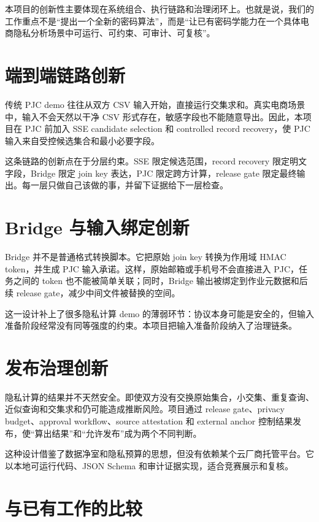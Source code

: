 \documentclass[UTF8,a4paper,12pt,oneside]{ctexrep}
\begin{document}
本项目的创新性主要体现在系统组合、执行链路和治理闭环上。也就是说，我们的工作重点不是“提出一个全新的密码算法”，而是“让已有密码学能力在一个具体电商隐私分析场景中可运行、可约束、可审计、可复核”。

\section{端到端链路创新}

传统 PJC demo 往往从双方 CSV 输入开始，直接运行交集求和。真实电商场景中，输入不会天然以干净 CSV 形式存在，敏感字段也不能随意导出。因此，本项目在 PJC 前加入 SSE candidate selection 和 controlled record recovery，使 PJC 输入来自受控候选集合和最小必要字段。

这条链路的创新点在于分层约束。SSE 限定候选范围，record recovery 限定明文字段，Bridge 限定 join key 表达，PJC 限定跨方计算，release gate 限定最终输出。每一层只做自己该做的事，并留下证据给下一层检查。

\section{Bridge 与输入绑定创新}

Bridge 并不是普通格式转换脚本。它把原始 join key 转换为作用域 HMAC token，并生成 PJC 输入承诺。这样，原始邮箱或手机号不会直接进入 PJC，任务之间的 token 也不能被简单关联；同时，Bridge 输出被绑定到作业元数据和后续 release gate，减少中间文件被替换的空间。

这一设计补上了很多隐私计算 demo 的薄弱环节：协议本身可能是安全的，但输入准备阶段经常没有同等强度的约束。本项目把输入准备阶段纳入了治理链条。

\section{发布治理创新}

隐私计算的结果并不天然安全。即使双方没有交换原始集合，小交集、重复查询、近似查询和交集求和仍可能造成推断风险。项目通过 release gate、privacy budget、approval workflow、source attestation 和 external anchor 控制结果发布，使“算出结果”和“允许发布”成为两个不同判断。

这种设计借鉴了数据净室和隐私预算的思想，但没有依赖某个云厂商托管平台。它以本地可运行代码、JSON Schema 和审计证据实现，适合竞赛展示和复核。

\section{与已有工作的比较}
\end{document}
